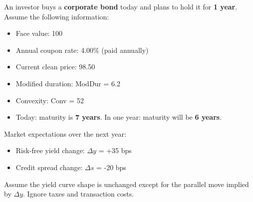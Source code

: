 \documentclass[12pt,a4paper]{exam}
\begin{document}
\begin{questions}

\makeemptybox{5cm}
\fillwithdottedlines{5cm}
\begin{solution}
\end{solution}

\question 
An investor buys a \textbf{corporate bond} today and plans to hold it for \textbf{1 year}. Assume the
following information:
\begin{itemize}
	\item Face value: 100
	\item Annual coupon rate: 4.00\% (paid annually)
	\item Current clean price: 98.50
	\item Modified duration: ModDur = 6.2
	\item Convexity: Conv = 52
	\item Today: maturity is \textbf{7 years}. In one year: maturity will be \textbf{6 years}.
\end{itemize}

Market expectations over the next year:
\begin{itemize}
	\item Risk-free yield change: $\Delta y$ = +35 bps
	\item Credit spread change: $\Delta s$ = -20 bps
\end{itemize}

Assume the yield curve shape is unchanged except for the parallel move implied by $\Delta y$.
Ignore taxes and transaction costs.

\end{questions}
\end{document}
